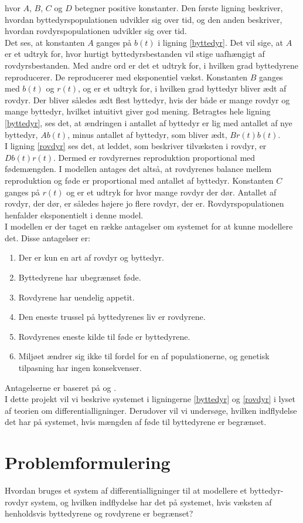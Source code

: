 \hfill \break
hvor $A$, $B$, $C$ og $D$ betegner positive konstanter. Den første ligning beskriver, hvordan byttedyrspopulationen udvikler sig over tid, og den anden beskriver, hvordan rovdyrspopulationen udvikler sig over tid.\\ \hfill \break
 Det ses, at konstanten $A$ ganges på $b(t)$ i ligning \eqref{byttedyr}. Det vil sige, at $A$ er et udtryk for, hvor hurtigt byttedyrsbestanden vil stige uafhængigt af rovdyrsbestanden. Med andre ord er det et udtryk for, i hvilken grad byttedyrene reproducerer. De reproducerer med eksponentiel vækst. Konstanten $B$ ganges med $b(t)$ og $r(t)$, og er et udtryk for, i hvilken grad byttedyr bliver ædt af rovdyr. Der bliver således ædt flest byttedyr, hvis der både er mange rovdyr og mange byttedyr, hvilket intuitivt giver god mening. Betragtes hele ligning \eqref{byttedyr}, ses det, at ændringen i antallet af byttedyr er lig med antallet af nye byttedyr, $Ab(t)$, minus antallet af byttedyr, som bliver ædt, $Br(t)b(t)$.\\ \hfill \break
I ligning \eqref{rovdyr} ses det, at leddet, som beskriver tilvæksten i rovdyr, er $Db(t)r(t)$. Dermed er rovdyrernes reproduktion proportional med fødemængden. I modellen antages det altså, at rovdyrenes balance mellem reproduktion og føde er proportional med antallet af byttedyr. Konstanten $C$ ganges på $r(t)$ og er et udtryk for hvor mange rovdyr der dør. Antallet af rovdyr, der dør, er således højere jo flere rovdyr, der er. Rovdyrspopulationen henfalder eksponentielt i denne model. \\ \hfill \break
I modellen er der taget en række antagelser om systemet for at kunne modellere det. Disse antagelser er:
\begin{enumerate}
    \item Der er kun en art af rovdyr og byttedyr.
    \item Byttedyrene har ubegrænset føde.
    \item Rovdyrene har uendelig appetit.
    \item Den eneste trussel på byttedyrenes liv er rovdyrene.
    \item Rovdyrenes eneste kilde til føde er byttedyrene.
    \item Miljøet ændrer sig ikke til fordel for en af populationerne, og genetisk tilpasning har ingen konsekvenser.
\end{enumerate}
Antagelserne er baseret på \citep{wikiLV} og \citep{Serv}.\\
I dette projekt vil vi beskrive systemet i ligningerne \eqref{byttedyr} og \eqref{rovdyr} i lyset af teorien om differentialligninger. Derudover vil vi undersøge, hvilken indflydelse det har på systemet, hvis mængden af føde til byttedyrene er begrænset.
\hfill \break
\section{Problemformulering} 
Hvordan bruges et system af differentialligninger til at modellere et byttedyr-rovdyr system, og hvilken indflydelse har det på systemet, hvis væksten af henholdsvis byttedyrene og rovdyrene er begrænset?


